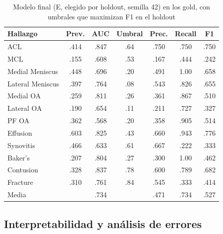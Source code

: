 \documentclass[conference]{IEEEtran}
\begin{document}
\begin{table}[t]
  \caption{Modelo final (E, elegido por holdout, semilla 42) en los gold, con umbrales que maximizan F1 en el holdout}
  \label{tab:prf}
  \centering
  \footnotesize
  \setlength{\tabcolsep}{4pt}
  \begin{tabular}{@{}lcccccc@{}}
    \toprule
    Hallazgo & Prev. & AUC & Umbral & Prec. & Recall & F1 \\
    \midrule
    ACL              & .414 & .847 & .64 & .750 & .750 & .750 \\
    MCL              & .155 & .608 & .53 & .167 & .444 & .242 \\
    Medial Meniscus  & .448 & .696 & .20 & .491 & 1.00 & .658 \\
    Lateral Meniscus & .397 & .764 & .08 & .543 & .826 & .655 \\
    Medial OA        & .259 & .811 & .26 & .361 & .867 & .510 \\
    Lateral OA       & .190 & .654 & .11 & .211 & .727 & .327 \\
    PF OA            & .362 & .568 & .20 & .358 & .905 & .514 \\
    Effusion         & .603 & .825 & .43 & .660 & .943 & .776 \\
    Synovitis        & .466 & .633 & .61 & .667 & .222 & .333 \\
    Baker's          & .207 & .804 & .27 & .300 & 1.00 & .462 \\
    Contusion        & .328 & .837 & .78 & .600 & .789 & .682 \\
    Fracture         & .310 & .761 & .84 & .545 & .333 & .414 \\
    \midrule
    Media            &      & .734 &     & .471 & .734 & .527 \\
    \bottomrule
  \end{tabular}
\end{table}

\subsection{Interpretabilidad y análisis de errores}
\label{sec:res-gradcam}
\end{document}
